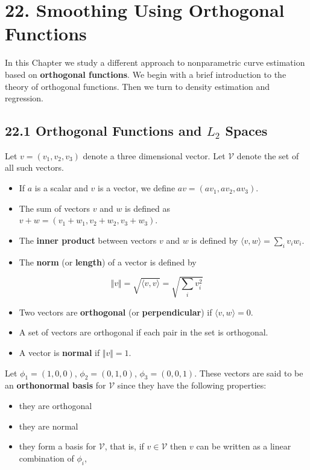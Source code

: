 \section*{22. Smoothing Using Orthogonal Functions}\label{smoothing-using-orthogonal-functions}
In this Chapter we study a different approach to nonparametric curve
estimation based on \textbf{orthogonal functions}. We begin with a brief
introduction to the theory of orthogonal functions. Then we turn to
density estimation and regression.

\subsection*{\texorpdfstring{22.1 Orthogonal Functions and \(L_{2}\) Spaces}{22.1 Orthogonal Functions and L\_{2} Spaces}}\label{orthogonal-functions-and-l_{2}-spaces}
Let \(v = (v_{1}, v_{2}, v_{3})\) denote a three dimensional vector. Let
\(\mathcal{V}\) denote the set of all such vectors.
\begin{itemize}[tightlist]
\item
  If \(a\) is a scalar and \(v\) is a vector, we define
  \(av = (av_{1}, av_{2}, av_{3})\).
\item
  The sum of vectors \(v\) and \(w\) is defined as
  \(v + w = (v_{1} + w_{1}, v_{2} + w_{2}, v_{3} + w_{3})\).
\item
  The \textbf{inner product} between vectors \(v\) and \(w\) is defined
  by \(\langle v, w \rangle = \sum_{i} v_{i} w_{i}\).
\item
  The \textbf{norm} (or \textbf{length}) of a vector is defined by
\end{itemize}
\[
\Vert v \Vert = \sqrt{\langle v, v \rangle} = \sqrt{\sum_{i} v_{i}^{2} }
\]
\begin{itemize}[tightlist]
\item
  Two vectors are \textbf{orthogonal} (or \textbf{perpendicular}) if
  \(\langle v, w \rangle = 0\).
\item
  A set of vectors are orthogonal if each pair in the set is orthogonal.
\item
  A vector is \textbf{normal} if \(\Vert v \Vert = 1\).
\end{itemize}
Let \(\phi_{1} = (1, 0, 0)\), \(\phi_{2} = (0, 1, 0)\),
\(\phi_{3} = (0, 0, 1)\). These vectors are said to be an
\textbf{orthonormal basis} for \(\mathcal{V}\) since they have the
following properties:
\begin{itemize}[tightlist]
\item
  they are orthogonal
\item
  they are normal
\item
  they form a basis for \(\mathcal{V}\), that is, if
  \(v \in \mathcal{V}\) then \(v\) can be written as a linear
  combination of \(\phi_{i}\),
\end{itemize}
